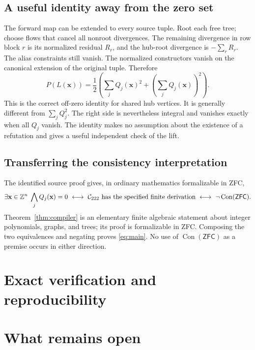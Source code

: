 \documentclass[11pt]{article}
\theoremstyle{definition}\newtheorem{definition}[theorem]{Definition}
\theoremstyle{remark}\newtheorem{remark}[theorem]{Remark}
\newcommand{\Z}{\mathbb Z}\newcommand{\N}{\mathbb N}
\newcommand{\Con}{\operatorname{Con}}\newcommand{\ZFC}{\mathsf{ZFC}}
\begin{document}
\subsection{A useful identity away from the zero set}
The forward map can be extended to every source tuple. Root each free tree;
choose flows that cancel all nonroot divergences. The remaining divergence in
row block $r$ is its normalized residual $R_r$, and the hub-root divergence is
$-\sum_rR_r$. The alias constraints still vanish. The normalized constructors
vanish on the canonical extension of the original tuple. Therefore
\begin{equation}\label{eq:offzero}
 P(L(\mathbf x))=\frac12\left(
              \sum_j Q_j(\mathbf x)^2+
                        \left(\sum_jQ_j(\mathbf x)\right)^2\right).
\end{equation}
This is the correct off-zero identity for shared hub vertices. It is generally
different from $\sum_jQ_j^2$. The right side is nevertheless integral and
vanishes exactly when all $Q_j$ vanish. The identity makes no assumption about
the existence of a refutation and gives a useful independent check of the lift.

\subsection{Transferring the consistency interpretation}
The identified source proof gives, in ordinary mathematics formalizable in ZFC,
\[
 \exists\mathbf x\in\Z^n\;\bigwedge_jQ_j(\mathbf x)=0
 \ \longleftrightarrow\
 \text{$\Ctwo$ has the specified finite derivation}
 \ \longleftrightarrow\ \neg\Con(\ZFC).
\]
Theorem~\ref{thm:compiler} is an elementary finite algebraic statement about
integer polynomials, graphs, and trees; its proof is formalizable in ZFC.
Composing the two equivalences and negating proves \eqref{eq:main}. No use of
$\Con(\ZFC)$ as a premise occurs in either direction.





\section{Exact verification and reproducibility}
\label{sec:verification}


\section{What remains open}
\label{sec:future}
\end{document}
